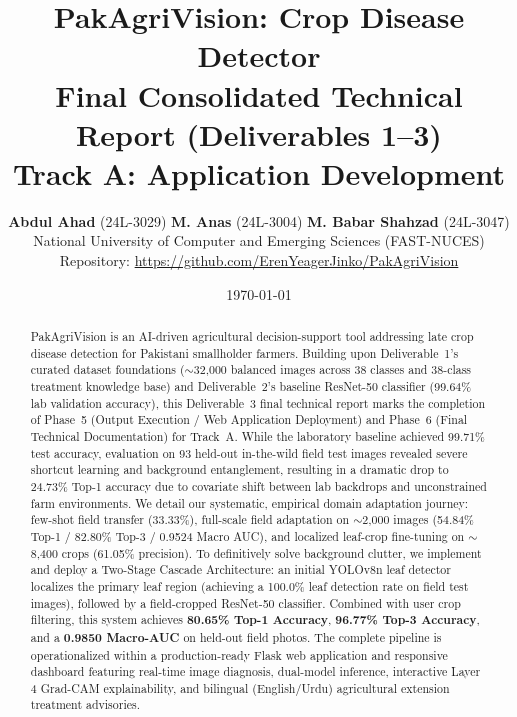 \documentclass[11pt,a4paper]{article}
\title{
    \textbf{PakAgriVision: Crop Disease Detector}\\
    \large Final Consolidated Technical Report (Deliverables 1--3)\\
    \normalsize Track A: Application Development
}
\author{
    \textbf{Abdul Ahad} (24L-3029) \quad 
    \textbf{M. Anas} (24L-3004) \quad 
    \textbf{M. Babar Shahzad} (24L-3047)\\[4pt]
    \small National University of Computer and Emerging Sciences (FAST-NUCES)\\
    \small Repository: \url{https://github.com/ErenYeagerJinko/PakAgriVision}
}
\date{\today}
\renewcommand{\_}{\textunderscore\allowbreak}
\begin{document}
\maketitle

\begin{abstract}
PakAgriVision is an AI-driven agricultural decision-support tool addressing late crop disease detection for Pakistani smallholder farmers. Building upon Deliverable~1's curated dataset foundations ($\sim$32,000 balanced images across 38 classes and 38-class treatment knowledge base) and Deliverable~2's baseline ResNet-50 classifier (99.64\% lab validation accuracy), this Deliverable~3 final technical report marks the completion of Phase~5 (Output Execution / Web Application Deployment) and Phase~6 (Final Technical Documentation) for Track~A. While the laboratory baseline achieved 99.71\% test accuracy, evaluation on 93 held-out in-the-wild field test images revealed severe shortcut learning and background entanglement, resulting in a dramatic drop to 24.73\% Top-1 accuracy due to covariate shift between lab backdrops and unconstrained farm environments. We detail our systematic, empirical domain adaptation journey: few-shot field transfer (33.33\%), full-scale field adaptation on $\sim$2,000 images (54.84\% Top-1 / 82.80\% Top-3 / 0.9524 Macro AUC), and localized leaf-crop fine-tuning on $\sim$8,400 crops (61.05\% precision). To definitively solve background clutter, we implement and deploy a Two-Stage Cascade Architecture: an initial YOLOv8n leaf detector localizes the primary leaf region (achieving a 100.0\% leaf detection rate on field test images), followed by a field-cropped ResNet-50 classifier. Combined with user crop filtering, this system achieves \textbf{80.65\% Top-1 Accuracy}, \textbf{96.77\% Top-3 Accuracy}, and a \textbf{0.9850 Macro-AUC} on held-out field photos. The complete pipeline is operationalized within a production-ready Flask web application and responsive dashboard featuring real-time image diagnosis, dual-model inference, interactive Layer 4 Grad-CAM explainability, and bilingual (English/Urdu) agricultural extension treatment advisories.
\end{abstract}








\end{document}
